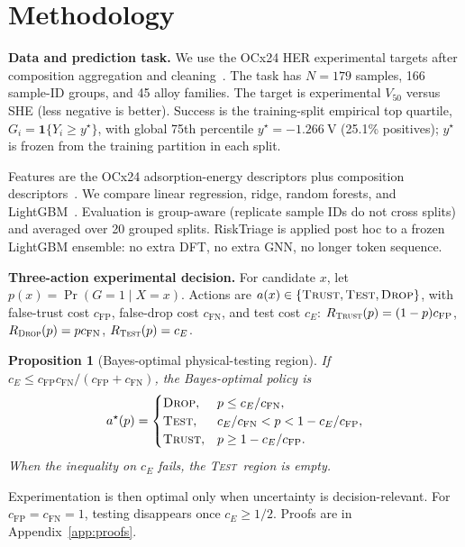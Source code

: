 \documentclass{article}
\newtheorem{proposition}{Proposition}
\newcommand{\test}{\textsc{Test}}
\newcommand{\trust}{\textsc{Trust}}
\newcommand{\dropa}{\textsc{Drop}}
\begin{document}
\section{Methodology}

\textbf{Data and prediction task.}
We use the OCx24 HER experimental targets after composition aggregation and cleaning~\citep{abed2024ocx}.
The task has $N=179$ samples, 166 sample-ID groups, and 45 alloy families.
The target is experimental $V_{50}$ versus SHE (less negative is better).
Success is the training-split empirical top quartile, $G_i=\mathbf{1}\{Y_i\ge y^\star\}$, with global 75th percentile $y^\star=-1.266~\mathrm{V}$ (25.1\% positives); $y^\star$ is frozen from the training partition in each split.

Features are the OCx24 adsorption-energy descriptors plus composition descriptors~\citep{abed2024ocx,ward2018matminer}.
We compare linear regression, ridge, random forests, and LightGBM~\citep{hoerl1970ridge,breiman2001rf,ke2017lightgbm}.
Evaluation is group-aware (replicate sample IDs do not cross splits) and averaged over 20 grouped splits.
RiskTriage is applied post hoc to a frozen LightGBM ensemble: no extra DFT, no extra GNN, no longer token sequence.

\textbf{Three-action experimental decision.}
For candidate $x$, let $p(x)=\Pr(G=1\mid X=x)$.
Actions are $a(x)\in\{\trust,\test,\dropa\}$, with false-trust cost $c_{\mathrm{FP}}$, false-drop cost $c_{\mathrm{FN}}$, and test cost $c_E$:
$R_{\trust}(p)=(1-p)c_{\mathrm{FP}}$,
$R_{\dropa}(p)=pc_{\mathrm{FN}}$,
$R_{\test}(p)=c_E$.

\begin{proposition}[Bayes-optimal physical-testing region]
\label{prop:bayes}
If $c_E\le c_{\mathrm{FP}}c_{\mathrm{FN}}/(c_{\mathrm{FP}}+c_{\mathrm{FN}})$,
the Bayes-optimal policy is
\[
a^\star(p)=
\begin{cases}
\dropa, & p\le c_E/c_{\mathrm{FN}},\\
\test, & c_E/c_{\mathrm{FN}} < p < 1-c_E/c_{\mathrm{FP}},\\
\trust, & p\ge 1-c_E/c_{\mathrm{FP}}.
\end{cases}
\]
When the inequality on $c_E$ fails, the \test\ region is empty.
\end{proposition}

Experimentation is then optimal only when uncertainty is decision-relevant.
For $c_{\mathrm{FP}}=c_{\mathrm{FN}}=1$, testing disappears once $c_E\ge 1/2$.
Proofs are in Appendix~\ref{app:proofs}.
\end{document}
